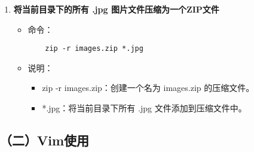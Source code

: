 \documentclass[UTF8]{ctexart}
\begin{document}
\begin{enumerate}
  \item \textbf{将当前目录下的所有 .jpg 图片文件压缩为一个ZIP文件}
  \begin{itemize}
    \item 命令：
    \begin{verbatim}
    zip -r images.zip *.jpg
    \end{verbatim}
    \item 说明：
    \begin{itemize}
      \item zip -r images.zip：创建一个名为 images.zip 的压缩文件。
      \item *.jpg：将当前目录下所有 .jpg 文件添加到压缩文件中。
    \end{itemize}
  \end{itemize}
\end{enumerate}


\subsection*{（二）Vim使用}
\end{document}
